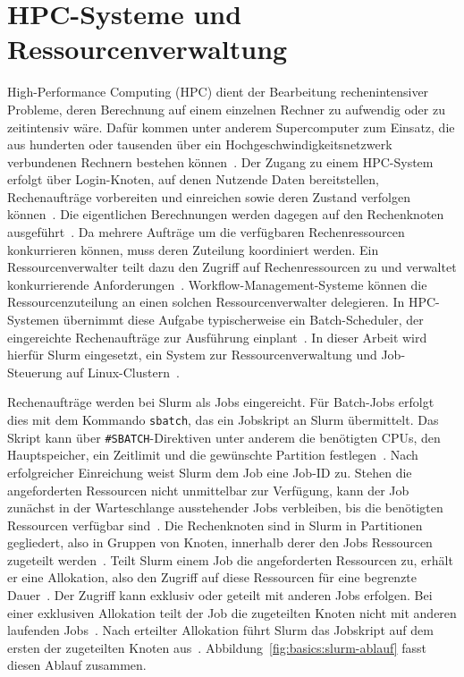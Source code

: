 \section{HPC-Systeme und Ressourcenverwaltung}
\label{sec:basics:hpc}
High-Performance Computing (HPC) dient der Bearbeitung
rechenintensiver Probleme, deren Berechnung auf einem einzelnen
Rechner zu aufwendig oder zu zeitintensiv wäre. Dafür kommen unter anderem Supercomputer zum Einsatz, die aus hunderten oder tausenden über ein
Hochgeschwindigkeitsnetzwerk verbundenen Rechnern bestehen
können~\cite{zdvhpc}. Der Zugang zu einem HPC-System erfolgt über
Login-Knoten, auf denen Nutzende Daten bereitstellen,
Rechenaufträge vorbereiten und einreichen sowie deren Zustand
verfolgen können~\cite{slurmdocs-admin}. Die eigentlichen
Berechnungen werden dagegen auf den Rechenknoten
ausgeführt~\cite{slurmdocs-admin}. Da mehrere Aufträge um die
verfügbaren Rechenressourcen konkurrieren können, muss deren
Zuteilung koordiniert werden. Ein Ressourcenverwalter teilt dazu
den Zugriff auf Rechenressourcen zu und verwaltet konkurrierende
Anforderungen~\cite{slurmdocs-quickstart}.
Workflow-Management-Systeme können die Ressourcenzuteilung an einen
solchen Ressourcenverwalter delegieren. In HPC-Systemen übernimmt
diese Aufgabe typischerweise ein
Batch-Scheduler, der eingereichte
Rechenaufträge zur Ausführung
einplant~\cite[S.~5]{suter2026terminology}. In dieser Arbeit wird hierfür Slurm eingesetzt, ein System zur Ressourcenverwaltung und Job-Steuerung auf Linux-Clustern~\cite{slurmdocs-quickstart}.

Rechenaufträge werden bei Slurm als Jobs eingereicht. Für
Batch-Jobs erfolgt dies mit dem Kommando \texttt{sbatch}, das ein
Jobskript an Slurm übermittelt. Das Skript kann über
\texttt{\#SBATCH}-Direktiven unter anderem die benötigten CPUs, den
Hauptspeicher, ein Zeitlimit und die gewünschte Partition
festlegen~\cite{slurmdocs-sbatch}. Nach erfolgreicher Einreichung
weist Slurm dem Job eine Job-ID zu. Stehen die angeforderten
Ressourcen nicht unmittelbar zur Verfügung, kann der Job zunächst
in der Warteschlange ausstehender Jobs verbleiben, bis die
benötigten Ressourcen verfügbar
sind~\cite{slurmdocs-sbatch}. Die Rechenknoten sind in Slurm in
Partitionen gegliedert, also in Gruppen von Knoten, innerhalb derer
den Jobs Ressourcen zugeteilt
werden~\cite{slurmdocs-quickstart}. Teilt Slurm einem Job die
angeforderten Ressourcen zu, erhält er eine Allokation, also den
Zugriff auf diese Ressourcen für eine begrenzte
Dauer~\cite{slurmdocs-quickstart}. Der Zugriff kann exklusiv oder
geteilt mit anderen Jobs erfolgen. Bei einer exklusiven Allokation
teilt der Job die zugeteilten Knoten nicht mit anderen laufenden
Jobs~\cite{slurmdocs-sbatch}. Nach erteilter Allokation führt Slurm
das Jobskript auf dem ersten der zugeteilten Knoten
aus~\cite{slurmdocs-sbatch}. Abbildung~\ref{fig:basics:slurm-ablauf} fasst diesen Ablauf
zusammen.

